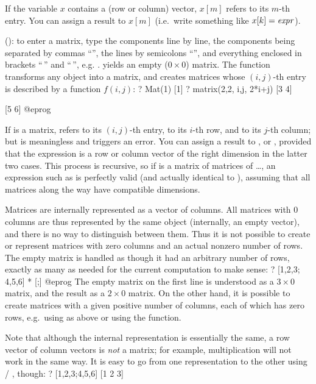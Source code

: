 If the variable $x$ contains a (row or column) vector, $x[m]$ refers to its
$m$-th entry. You can assign a result to $x[m]$ (i.e.~write something like
$x[k]=\hbox{\it expr\/}$).

 (): to enter a matrix, type
the components line by line, the components being separated by commas
``\kbd{,}'', the lines by semicolons ``\kbd{;}'', and everything enclosed in
brackets ``\kbd{[}$\,$'' and ``$\,$\kbd{]}'', e.g. \kbd{[x,y; z,t; u,v]}.
\kbd{[;]} yields an empty ($0 \times 0$) matrix. The function 
transforms any object into a matrix, and  creates matrices
whose $(i,j)$-th entry is described by a function $f(i,j)$:
\bprog
? Mat(1)
[1]
? matrix(2,2, i,j, 2*i+j)
[3 4]

[5 6]
@eprog

If  is a matrix,  refers to its $(i,j)$-th entry,
 to its $i$-th row, and
 to its $j$-th column; but  is meaningless and triggers
an error. You can assign a result to ,  or
, provided that the expression is a row or column vector of the
right dimension in the latter two cases. This process is recursive, so if
is a matrix of matrices of \dots, an expression such as  is perfectly valid (and actually identical to ),
assuming that all matrices along the way have compatible dimensions.

 Matrices are internally represented
as a vector of columns. All matrices with $0$ columns are thus represented
by the same object (internally, an empty vector), and there is no way to
distinguish between them. Thus it is not possible to create or represent
matrices with zero columns and an actual nonzero number of rows.
The empty matrix \kbd{[;]} is handled as though it had an arbitrary number of
rows, exactly as many as needed for the current computation to make sense:
\bprog
? [1,2,3; 4,5,6] * [;]
@eprog\noindent
The empty matrix on the first line is understood as a $3\times 0$ matrix, and
the result as a $2\times 0$ matrix. On the other hand, it is possible to
create matrices with a given positive number of columns, each of which has
zero rows, e.g.~using  as above or using the  function.

Note that although the internal representation is essentially the same, a row
vector of column vectors is \emph{not} a matrix; for example, multiplication
will not work in the same way. It is easy to go from one representation to
the other using  / , though:
\bprog
? [1,2,3;4,5,6]
[1 2 3]

